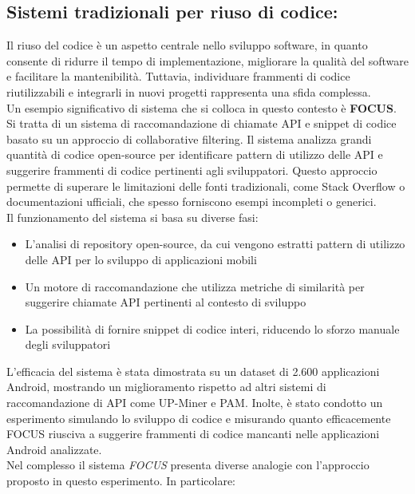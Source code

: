 \documentclass{article}
\begin{document}
\subsection{Sistemi tradizionali per riuso di codice:}
Il riuso del codice è un aspetto centrale nello sviluppo software, in quanto consente di ridurre il tempo di implementazione, migliorare la qualità del software e facilitare la mantenibilità. Tuttavia, individuare frammenti di codice riutilizzabili e integrarli in nuovi progetti rappresenta una sfida complessa.\\
Un esempio significativo di sistema che si colloca in questo contesto è \textbf{FOCUS}\cite{nguyen2021recommending}. Si tratta di un sistema di raccomandazione di chiamate API e snippet di codice basato su un approccio di collaborative filtering. Il sistema analizza grandi quantità di codice open-source per identificare pattern di utilizzo delle API e suggerire frammenti di codice pertinenti agli sviluppatori. Questo approccio permette di superare le limitazioni delle fonti tradizionali, come Stack Overflow o documentazioni ufficiali, che spesso forniscono esempi incompleti o generici.\\
Il funzionamento del sistema si basa su diverse fasi:
\begin{itemize}
    \item L’analisi di repository open-source, da cui vengono estratti pattern di utilizzo delle API per lo sviluppo di applicazioni mobili
    \item Un motore di raccomandazione che utilizza metriche di similarità per suggerire chiamate API pertinenti al contesto di sviluppo
    \item La possibilità di fornire snippet di codice interi, riducendo lo sforzo manuale degli sviluppatori
\end{itemize}
L’efficacia del sistema è stata dimostrata su un dataset di 2.600 applicazioni Android, mostrando un miglioramento rispetto ad altri sistemi di raccomandazione di API come UP-Miner e PAM. Inolte, è stato condotto un esperimento simulando lo sviluppo di codice e misurando quanto efficacemente FOCUS riusciva a suggerire frammenti di codice mancanti nelle applicazioni Android analizzate.\\
Nel complesso il sistema \textit{FOCUS} presenta diverse analogie con l'approccio proposto in questo esperimento. In particolare:
\end{document}

